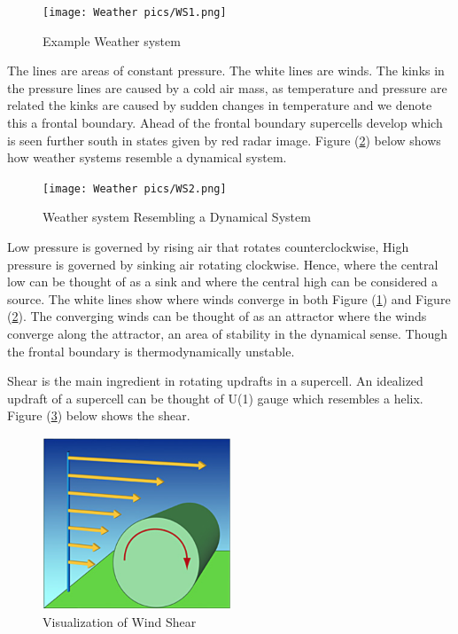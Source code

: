 \documentclass[12pt]{report}
\begin{document}
\begin{figure}[H]
    \centering
    \texttt{[image: Weather pics/WS1.png]}
    \caption{Example Weather system} \label{fig:WS1}
\end{figure}
\noindent

The lines are areas of constant pressure. The white lines are winds. The
kinks in the pressure lines are caused by a cold air mass, as temperature and pressure are related the kinks are caused by sudden changes in temperature and we denote this a frontal boundary. Ahead of the frontal boundary supercells develop which is seen further south in states given by red radar image. Figure (\ref{fig:WS2}) below shows how weather systems resemble a dynamical system.

\begin{figure}[H]
    \centering
    \texttt{[image: Weather pics/WS2.png]}
    \caption{Weather system Resembling a Dynamical System} \label{fig:WS2}
\end{figure}
\noindent

Low pressure is governed by rising air that rotates counterclockwise, High
pressure is governed by sinking air rotating clockwise. Hence, where the
central low can be thought of as a sink and where the central high can be considered a source. The white lines show where winds converge in both
Figure (\ref{fig:WS1}) and Figure (\ref{fig:WS2}). The converging winds can be thought of as an attractor where the winds converge along the attractor, an area of stability in the dynamical sense. Though the frontal boundary is thermodynamically unstable.

Shear is the main ingredient in rotating updrafts in a supercell. An
idealized updraft of a supercell can be thought of U(1) gauge which
resembles a helix. Figure (\ref{fig:WS3}) below shows the shear.

\begin{figure}[H]
    \centering
    \includegraphics[width=0.5\textwidth]{Weather pics/WS3.png}
    \caption{Visualization of Wind Shear} \label{fig:WS3}
\end{figure}
\noindent
\end{document}
